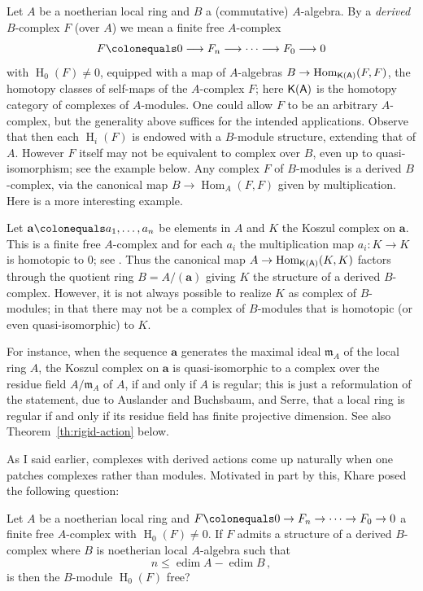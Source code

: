 \documentclass[twoside,leqno]{article}
\newcommand{\edim}{\operatorname{edim}}
\newcommand{\fm}{{\mathfrak m}}
\newcommand{\hh}{\operatorname{H}}
\newcommand{\Hom}{\operatorname{Hom}}
\begin{document}
 Let $A$ be a noetherian local ring and $B$ a (commutative) $A$-algebra. By a \emph{derived} $B$-complex $F$ (over $A$) we mean a finite free $A$-complex
\[
F\colonequals 0\longrightarrow F_n\longrightarrow \cdots \longrightarrow F_0\longrightarrow 0
\]
with $\hh_0(F)\ne 0$, equipped with a map of $A$-algebras $B\to \Hom_{\sf K(A)}(F,F)$, the homotopy classes of self-maps of the $A$-complex $F$; here $\sf K(A)$ is the homotopy category of complexes of $A$-modules. One could allow $F$ to be an arbitrary $A$-complex, but the  generality above suffices for the intended applications. Observe that then each  $\hh_i(F)$ is endowed with a $B$-module structure, extending that of $A$. However $F$ itself may not be equivalent to complex over $B$, even up to quasi-isomorphism; see the example below.  Any complex $F$ of $B$-modules is a derived $B$-complex, via the canonical map $B\to \Hom_A(F,F)$ given by multiplication. Here is a more interesting example.

\begin{examples}
   \label{ex:derived-complexes} 
Let $\mathbf{a}\colonequals a_1,\dots,a_n$ be elements in $A$ and $K$ the Koszul complex on $\mathbf{a}$. This is a finite free $A$-complex and for each $a_i$ the multiplication map $a_i\colon K\to K$ is homotopic to $0$; see \cite[Proposition~1.6.5]{Bruns/Herzog:1998a}. Thus the canonical map $A\to \Hom_{\sf K(A)}(K,K)$ factors through the quotient ring $B=A/(\mathbf{a})$ giving $K$ the structure of a derived $B$-complex. However, it is not always possible to realize $K$ as complex of $B$-modules; in that there may not be a complex of $B$-modules that is homotopic (or even quasi-isomorphic) to $K$.

For instance, when the sequence $\mathbf a$ generates the maximal ideal $\fm_A$ of the local ring $A$, the Koszul complex on $\mathbf{a}$ is quasi-isomorphic to a complex over the residue field $A/\fm_A$ of $A$, if and only if $A$ is regular; this is just a reformulation of the statement, due to Auslander and Buchsbaum, and Serre, that a local ring is regular if and only if its residue field has finite projective dimension. See also Theorem~\ref{th:rigid-action}
 below. \end{examples}

As I said earlier, complexes with derived actions come up naturally when one patches complexes rather than modules. Motivated in part by this, Khare posed the following question:

\begin{question}
\label{qu:Shekhar}
Let $A$ be a noetherian local ring and $F\colonequals 0\to F_n\to \cdots \to F_0\to 0$ a finite free $A$-complex with  $\hh_0(F)\ne 0$. If $F$ admits a structure of a derived $B$-complex where $B$ is  noetherian local $A$-algebra such that
\[
n \le  \edim A - \edim B \,,
\]
is then the $B$-module $\hh_{0}(F)$ free?
\end{question}
\end{document}
